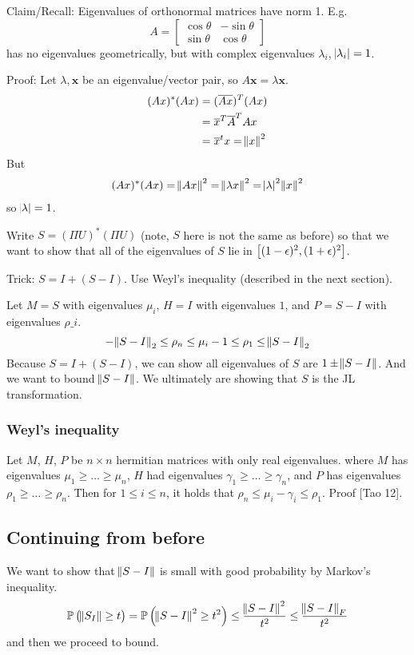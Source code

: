 \documentclass{article}
\newcommand{\m}[1]{\begin{bmatrix} #1 \end{bmatrix}}
\begin{document}
Claim/Recall: Eigenvalues of orthonormal matrices have norm 1.
E.g.
\[A =\m{\cos \theta & - \sin \theta\\ \sin \theta & \cos \theta}\]
has no eigenvalues geometrically, but with complex eigenvalues \(\lambda_i\), \(\abs{\lambda_i} = 1\).

Proof: Let \(\lambda, \bm x\) be an eigenvalue/vector pair, so \(A\bm x = \lambda\bm x\).
\begin{align*}
  (Ax)^*(Ax) &= (\overline{Ax})^T(Ax)\\
            &= \overline{x}^T\overline{A}^TAx\\
  &= \overline{x}^tx = \norm{x}^2
\end{align*}
But
\begin{align*}
  (Ax)^*(Ax) = \norm{Ax}^2 = \norm{\lambda x}^2 = \abs{\lambda}^2\norm{x}^2
\end{align*}
so \(\abs{\lambda} = 1\).

Write \(S = (\Pi U)^*(\Pi U)\) (note, \(S\) here is not the same as before) so that we want to show that all of the eigenvalues of \(S\) lie in \(\intcc{(1 - \epsilon)^2, (1 + \epsilon)^2}\).

Trick: \(S = I + (S - I)\).
Use Weyl's inequality (described in the next section).

Let \(M = S\) with eigenvalues \(\mu_i\), \( H = I\) with eigenvalues \(1\), and \(P = S-I \) with eigenvalues \(\rho\_i\).
\[-\norm{S-I}_2 \leq\rho_n \leq \mu_i -1 \leq \rho_1 \leq \norm{S-I}_2\]
Because \(S = I + (S - I)\), we can show all eigenvalues of \(S\) are \(1 \pm \norm{S-I}\).
And we want to bound \(\norm{S-I}\).
We ultimately are showing that \(S\) is the JL transformation.


\subsubsection{Weyl's inequality}
Let \(M\), \(H\), \(P\) be \(n \times n\) hermitian matrices with only real eigenvalues.
where \(M\) has eigenvalues \(\mu_1 \geq \dots \geq \mu _n\), \(H\) had eigenvalues \(\gamma_1 \geq \dots \geq \gamma_n\), and \(P\) has eigenvalues \(\rho_1 \geq \dots \geq \rho_n\).
Then for  \(1 \leq i \leq n\), it holds that \(\rho_n \leq \mu_i - \gamma_i \leq \rho_1\).
Proof [Tao 12].

\subsection{Continuing from before}
We want to show that \(\norm{S-I}\) is small with good probability by Markov's inequality.
\[\mathbb P \del{\norm{S_I} \geq t} = \mathbb P \del{\norm{S-I}^2 \geq t^2} \leq \frac{\norm{S-I}^2}{t^2} \leq \frac{\norm{S-I}_F}{t^2}\]
and then we proceed to bound.
\end{document}
